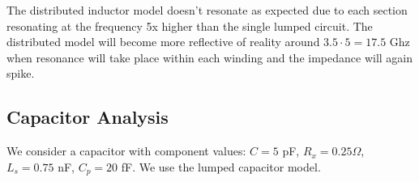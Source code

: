 \documentclass[11pt]{article}
\begin{document}
The distributed inductor model doesn't resonate as expected due to each section resonating at the frequency 5x higher than the single lumped circuit. The distributed model will become more reflective of reality around $3.5 \cdot 5 = 17.5$ Ghz when resonance will take place within each winding and the impedance will again spike.

\subsection{Capacitor Analysis}
We consider a capacitor with component values: $C = 5$ pF, $R_x = 0.25\Omega$, $L_s = 0.75$ nF, $C_p = 20$ fF. We use the lumped capacitor model.
\end{document}
